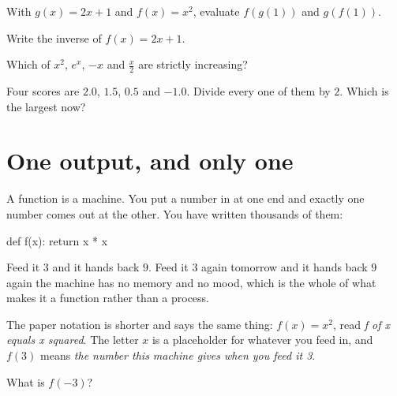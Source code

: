 \begin{quiz}
\item With $g(x) = 2x + 1$ and $f(x) = x^{2}$, evaluate $f(g(1))$ and
  $g(f(1))$. 
\item Write the inverse of $f(x) = 2x + 1$. 
\item Which of $x^{2}$, $e^{x}$, $-x$ and $\frac{x}{2}$ are strictly
  increasing? 
\item Four scores are $\num{2.0}$, $\num{1.5}$, $\num{0.5}$ and $-\num{1.0}$.
  Divide every one of them by $2$. Which is the largest now?
\end{quiz}

\section{One output, and only one}
\label{sec:F05-machine}

\begin{fr}
A function is a machine. You put a number in at one end and exactly one number
comes out at the other. You have written thousands of them:

\begin{python}
def f(x):
    return x * x
\end{python}

Feed it $3$ and it hands back $9$. Feed it $3$ again tomorrow and it hands back
$9$ again \dash{} the machine has no memory and no mood, which is the whole of
what makes it a function rather than a process.

The paper notation is shorter and says the same thing: $f(x) = x^{2}$, read
\emph{f of x equals x squared}. The letter $x$ is a placeholder for whatever
you feed in, and $f(3)$ means \emph{the number this machine gives when you feed
it 3}.

What is $f(-3)$?
\nextframe
\end{fr}

